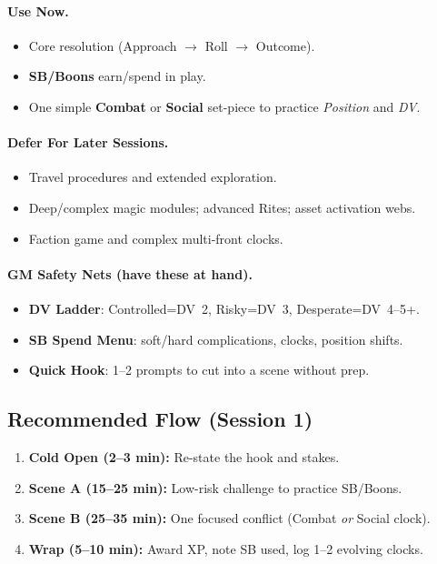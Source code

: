 \paragraph{Use Now.}
\begin{itemize}
  \item Core resolution (Approach $\rightarrow$ Roll $\rightarrow$ Outcome).
  \item \textbf{SB/Boons} earn/spend in play.
  \item One simple \textbf{Combat} or \textbf{Social} set-piece to practice \emph{Position} and \emph{DV}.
\end{itemize}

\paragraph{Defer For Later Sessions.}
\begin{itemize}
  \item Travel procedures and extended exploration.
  \item Deep/complex magic modules; advanced Rites; asset activation webs.
  \item Faction game and complex multi-front clocks.
\end{itemize}

\paragraph{GM Safety Nets (have these at hand).}
\begin{itemize}
  \item \textbf{DV Ladder}: Controlled=DV~2, Risky=DV~3, Desperate=DV~4–5+.
  \item \textbf{SB Spend Menu}: soft/hard complications, clocks, position shifts.
  \item \textbf{Quick Hook}: 1–2 prompts to cut into a scene without prep.
\end{itemize}

\subsection*{Recommended Flow (Session 1)}
\begin{enumerate}
  \item \textbf{Cold Open (2–3 min):} Re-state the hook and stakes.
  \item \textbf{Scene A (15–25 min):} Low-risk challenge to practice SB/Boons.
  \item \textbf{Scene B (25–35 min):} One focused conflict (Combat \emph{or} Social clock).
  \item \textbf{Wrap (5–10 min):} Award XP, note SB used, log 1–2 evolving clocks.
\end{enumerate}

